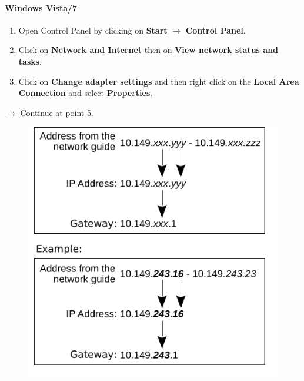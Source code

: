 \documentclass[a4paper,12pt]{scrartcl}
\newcommand{\optemph}[1]{\textbf{#1}}
\begin{document}
\paragraph*{Windows Vista/7}
\begin{enumerate}
	\item Open Control Panel by clicking on \optemph{Start} $\rightarrow$ \optemph{Control Panel}.
    \item Click on \optemph{Network and Internet} then on \optemph{View network status and tasks}.
	\item Click on \optemph{Change adapter settings} and then right click on the \optemph{Local Area Connection} and select \optemph{Properties}.
\end{enumerate}
$\rightarrow$ Continue at point 5.
      \begin{figure}[h!]
	\centering
        \vspace{-5pt}
        \begin{minipage}[c]{0.45\linewidth}
          \centering
          \includegraphics[width=\linewidth,keepaspectratio]{Bilder/IP_Gerneric_EN_mb}
        \end{minipage}
        \begin{minipage}[c]{0.48\linewidth}
          \centering

\end{minipage}
\end{figure}
\end{document}
